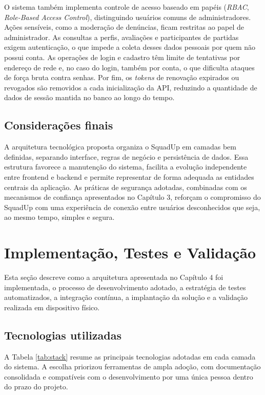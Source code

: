 \documentclass[a4paper, 12pt]{article}
\begin{document}
\begin{justify}
O sistema também implementa controle de acesso baseado em papéis (\textit{RBAC}, \textit{Role-Based Access Control}), distinguindo usuários comuns de administradores. Ações sensíveis, como a moderação de denúncias, ficam restritas ao papel de administrador. As consultas a perfis, avaliações e participantes de partidas exigem autenticação, o que impede a coleta desses dados pessoais por quem não possui conta. As operações de login e cadastro têm limite de tentativas por endereço de rede e, no caso do login, também por conta, o que dificulta ataques de força bruta contra senhas. Por fim, os \textit{tokens} de renovação expirados ou revogados são removidos a cada inicialização da API, reduzindo a quantidade de dados de sessão mantida no banco ao longo do tempo.

\subsection{Considerações finais}

A arquitetura tecnológica proposta organiza o SquadUp em camadas bem definidas, separando interface, regras de negócio e persistência de dados. Essa estrutura favorece a manutenção do sistema, facilita a evolução independente entre frontend e backend e permite representar de forma adequada as entidades centrais da aplicação. As práticas de segurança adotadas, combinadas com os mecanismos de confiança apresentados no Capítulo 3, reforçam o compromisso do SquadUp com uma experiência de conexão entre usuários desconhecidos que seja, ao mesmo tempo, simples e segura.

\clearpage

\section{Implementação, Testes e Validação}

Esta seção descreve como a arquitetura apresentada no Capítulo 4 foi implementada, o processo de desenvolvimento adotado, a estratégia de testes automatizados, a integração contínua, a implantação da solução e a validação realizada em dispositivo físico.

\subsection{Tecnologias utilizadas}

A Tabela \ref{tab:stack} resume as principais tecnologias adotadas em cada camada do sistema. A escolha priorizou ferramentas de ampla adoção, com documentação consolidada e compatíveis com o desenvolvimento por uma única pessoa dentro do prazo do projeto.


\end{justify}
\end{document}
